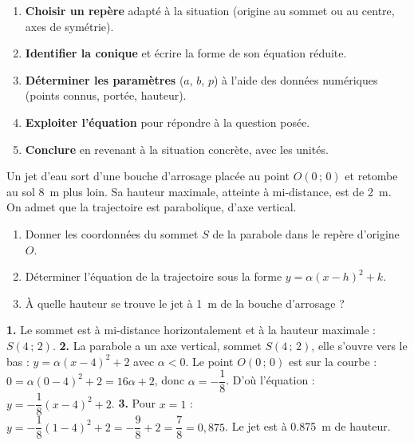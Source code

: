 \documentclass[11pt]{article}
\begin{document}
\begin{methode}
\begin{enumerate}
\item \textbf{Choisir un repère} adapté à la situation (origine au sommet ou au centre, axes de symétrie).
\item \textbf{Identifier la conique} et écrire la forme de son équation réduite.
\item \textbf{Déterminer les paramètres} ($a$, $b$, $p$) à l'aide des données numériques (points connus, portée, hauteur).
\item \textbf{Exploiter l'équation} pour répondre à la question posée.
\item \textbf{Conclure} en revenant à la situation concrète, avec les unités.
\end{enumerate}
\end{methode}

\begin{exercice}
Un jet d'eau sort d'une bouche d'arrosage placée au point $O(0\,;\,0)$ et retombe au sol \SI{8}{m} plus loin. Sa hauteur maximale, atteinte à mi-distance, est de \SI{2}{m}. On admet que la trajectoire est parabolique, d'axe vertical.
\begin{enumerate}
\item Donner les coordonnées du sommet $S$ de la parabole dans le repère d'origine $O$.
\item Déterminer l'équation de la trajectoire sous la forme $y = \alpha(x - h)^2 + k$.
\item À quelle hauteur se trouve le jet à \SI{1}{m} de la bouche d'arrosage ?
\end{enumerate}
\end{exercice}

\begin{corrige}
\textbf{1.} Le sommet est à mi-distance horizontalement et à la hauteur maximale : $S(4\,;\,2)$.
\textbf{2.} La parabole a un axe vertical, sommet $S(4\,;\,2)$, elle s'ouvre vers le bas : $y = \alpha(x-4)^2 + 2$ avec $\alpha < 0$.
Le point $O(0\,;\,0)$ est sur la courbe : $0 = \alpha(0-4)^2 + 2 = 16\alpha + 2$, donc $\alpha = -\dfrac{1}{8}$.
D'où l'équation : $y = -\dfrac{1}{8}(x-4)^2 + 2$.
\textbf{3.} Pour $x = 1$ : $y = -\dfrac{1}{8}(1-4)^2 + 2 = -\dfrac{9}{8} + 2 = \dfrac{7}{8} = 0{,}875$. Le jet est à \SI{0,875}{m} de hauteur.
\end{corrige}
\end{document}
